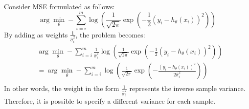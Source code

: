 \begin{description}
        Consider MSE formulated as follows:
        \[ \arg\min_\theta - \sum_{i=i}^{m} \log\left( \frac{1}{\sqrt{2\pi}} \exp\left( -\frac{1}{2}(y_i - h_\theta(x_i))^2 \right) \right) \]
        By adding as weights $\frac{1}{\hat{\sigma}_i^2}$, the problem becomes:
        \[ 
            \begin{split}
                &\arg\min_\theta - \sum_{i=i}^{m} \frac{1}{\hat{\sigma}_i^2} \log\left( \frac{1}{\sqrt{2\pi}} \exp\left( -\frac{1}{2}(y_i - h_\theta(x_i))^2 \right) \right) \\
                &= \arg\min_\theta - \sum_{i=i}^{m} \log\left( \frac{1}{\sqrt{2\pi}} \exp\left( -\frac{(y_i - h_\theta(x_i))^2}{2\hat{\sigma}_i^2} \right) \right) \\
            \end{split}
        \]
        In other words, the weight in the form $\frac{1}{\hat{\sigma}_i^2}$ represents the inverse sample variance. Therefore, it is possible to specify a different variance for each sample.
\end{description}
